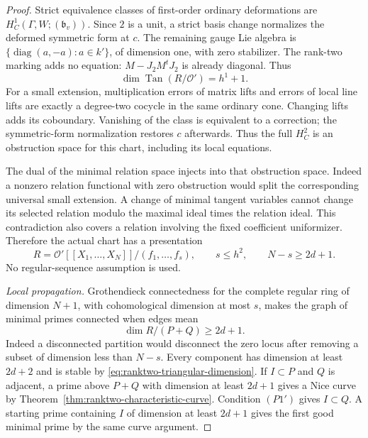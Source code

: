 \begin{proof}
Strict equivalence classes of first-order ordinary deformations are
$H^1_C(\Gamma,W;(\mathfrak b_v))$.  Since $2$ is a unit,
a strict basis change normalizes the deformed symmetric form at $c$.
The remaining gauge Lie algebra is
$\{\operatorname{diag}(a,-a):a\in k'\}$, of dimension one,
with zero stabilizer.  The rank-two marking adds no equation:
$M-J_2M^tJ_2$ is already diagonal.  Thus
\begin{equation}\label{eq:ranktwo-tangent}
                       \dim\operatorname{Tan}(R/\mathcal O')=h^1+1.
\end{equation}
For a small extension, multiplication errors of matrix lifts and
errors of local line lifts are exactly a degree-two cocycle in the
same ordinary cone.  Changing lifts adds its coboundary.  Vanishing
of the class is equivalent to a correction; the symmetric-form
normalization restores $c$ afterwards.  Thus the full $H^2_C$ is
an obstruction space for this chart, including its local equations.

The dual of the minimal relation space injects into that obstruction
space.  Indeed a nonzero relation functional with zero obstruction
would split the corresponding universal small extension.  A change
of minimal tangent variables cannot change its selected relation
modulo the maximal ideal times the relation ideal.  This contradiction
also covers a relation involving the fixed coefficient uniformizer.
Therefore the actual chart has a presentation
\begin{equation}\label{eq:ranktwo-presentation}
 R=\mathcal O'[[X_1,\ldots,X_N]]/(f_1,\ldots,f_s),\qquad
 s\le h^2,\qquad N-s\ge2d+1.
\end{equation}
No regular-sequence assumption is used.

\emph{Local propagation.}
Grothendieck connectedness for the complete regular ring of dimension
$N+1$, with cohomological dimension at most $s$, makes the graph of
minimal primes connected when edges mean
\begin{equation}\label{eq:ranktwo-component-edges}
                         \dim R/(P+Q)\ge2d+1.
\end{equation}
Indeed a disconnected partition would disconnect the zero locus
after removing a subset of dimension less than $N-s$.
\cite{support-ranktwo-connectedness}
Every component has dimension at least $2d+2$ and is stable by
\eqref{eq:ranktwo-triangular-dimension}.  If $I\subset P$ and $Q$
is adjacent, a prime above $P+Q$ with dimension at least $2d+1$
gives a Nice curve by Theorem~\ref{thm:ranktwo-characteristic-curve}.
Condition $(P1')$ gives $I\subset Q$.  A starting prime containing
$I$ of dimension at least $2d+1$ gives the first good minimal prime
by the same curve argument.


\end{proof}
